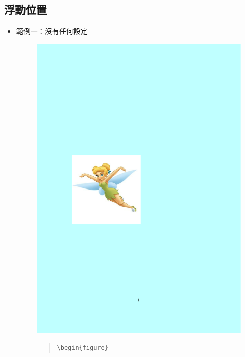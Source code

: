 \documentclass[12pt,a4paper]{report}
\begin{document}
\begin{CJK}{UTF8}{bkai}
\section{浮動位置}
\begin{itemize}
\item 範例一：沒有任何設定
\begin{figure}[!h] 
\begin{minipage}[b]{0.5\textwidth} 
\centering 
\includegraphics[scale=0.3]{./pics/float_example_1.pdf} 
\end{minipage}%
\begin{minipage}[b]{0.5\textwidth} 
\begin{footnotesize}
\begin{quote}
\begin{verbatim}
\begin{figure}

\end{verbatim}
\end{quote}
\end{footnotesize}
\end{minipage}
\end{figure}
\end{itemize}
\end{CJK}
\end{document}
